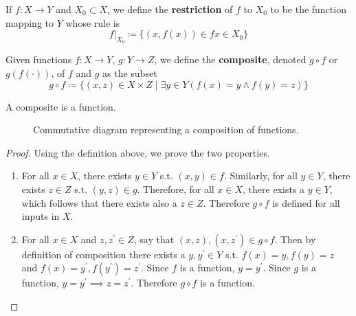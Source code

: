   \begin{definition}[Restriction]
    If $f: X \rightarrow Y$ and $X_0 \subset X$, we define the \textbf{restriction} of $f$ to $X_0$ to be the function mapping to $Y$ whose rule is 
    \begin{equation}
      f|_{X_0} \coloneqq \{ (x, f(x)) \in f x \in X_0 \}
    \end{equation}
  \end{definition} 

  \begin{definition}[Composition]
    Given functions $f: X \rightarrow Y$, $g: Y \rightarrow Z$, we define the \textbf{composite}, denoted $g \circ f$ or $g(f(\cdot))$, of $f$ and $g$ as the subset
    \begin{equation}
      g \circ f \coloneqq \{ (x, z) \in X \times Z \mid \exists y \in Y (f(x) = y \land f(y) = z) \}
    \end{equation} 
  \end{definition}

  \begin{theorem}[Compositions]
    A composite is a function. 
    \begin{figure}[H]
      \centering 
      \caption{Commutative diagram representing a composition of functions.} 
      \label{fig:composition}
    \end{figure}
  \end{theorem}
  \begin{proof}
    Using the definition above, we prove the two properties. 
    \begin{enumerate}
      \item For all $x \in X$, there exists $y \in Y$ s.t. $(x, y) \in f$. Similarly, for all $y \in Y$, there exists $z \in Z$ s.t. $(y, z) \in g$. Therefore, for all $x \in X$, there exists a $y \in Y$, which follows that there exists also a $z \in Z$. Therefore $g \circ f$ is defined for all inputs in $X$. 
      \item For all $x \in X$ and $z, z^\prime \in Z$, say that $(x, z), (x, z^\prime) \in g \circ f$. Then by definition of composition there exists a $y, y^\prime \in Y$ s.t. $f(x) = y, f(y) = z$ and $f(x) = y^\prime, f(y^\prime) = z^\prime$. Since $f$ is a function, $y = y^\prime$. Since $g$ is a function, $y = y^\prime \implies z = z^\prime$. Therefore $g \circ f$ is a function. 
    \end{enumerate}
  \end{proof}

